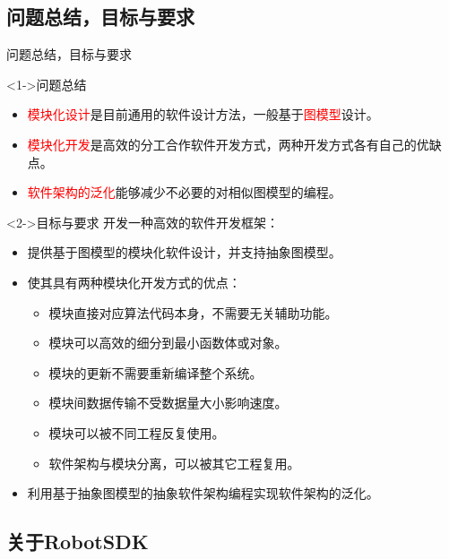 \documentclass[9pt]{beamer}
\begin{document}
	\subsection{问题总结，目标与要求}
	\begin{frame}{问题总结，目标与要求}
		\begin{block}<1->{问题总结}
			\begin{itemize}
				\item \textcolor{red}{模块化设计}是目前通用的软件设计方法，一般基于\textcolor{red}{图模型}设计。
				\item \textcolor{red}{模块化开发}是高效的分工合作软件开发方式，两种开发方式各有自己的优缺点。
				\item \textcolor{red}{软件架构的泛化}能够减少不必要的对相似图模型的编程。
			\end{itemize}
		\end{block}
		\begin{block}<2->{目标与要求}
			开发一种高效的软件开发框架：
			\begin{itemize}
				\item<3-> 提供基于图模型的模块化软件设计，并支持抽象图模型。
				\item<4-> 使其具有两种模块化开发方式的优点：
				\begin{itemize}
					\item 模块直接对应算法代码本身，不需要无关辅助功能。
					\item 模块可以高效的细分到最小函数体或对象。
					\item 模块的更新不需要重新编译整个系统。
					\item 模块间数据传输不受数据量大小影响速度。
					\item 模块可以被不同工程反复使用。
					\item 软件架构与模块分离，可以被其它工程复用。			
				\end{itemize}
				\item<5-> 利用基于抽象图模型的抽象软件架构编程实现软件架构的泛化。
			\end{itemize}
		\end{block}
	\end{frame}
	
	\subsection{关于RobotSDK}
\end{document}
